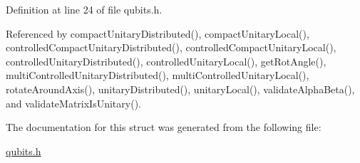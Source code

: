 Definition at line 24 of file qubits.h.

Referenced by compactUnitaryDistributed(), compactUnitaryLocal(), controlledCompactUnitaryDistributed(), controlledCompactUnitaryLocal(), controlledUnitaryDistributed(), controlledUnitaryLocal(), getRotAngle(), multiControlledUnitaryDistributed(), multiControlledUnitaryLocal(), rotateAroundAxis(), unitaryDistributed(), unitaryLocal(), validateAlphaBeta(), and validateMatrixIsUnitary().

The documentation for this struct was generated from the following file:\begin{DoxyCompactItemize}
\item 
\hyperlink{qubits_8h}{qubits.h}\end{DoxyCompactItemize}
